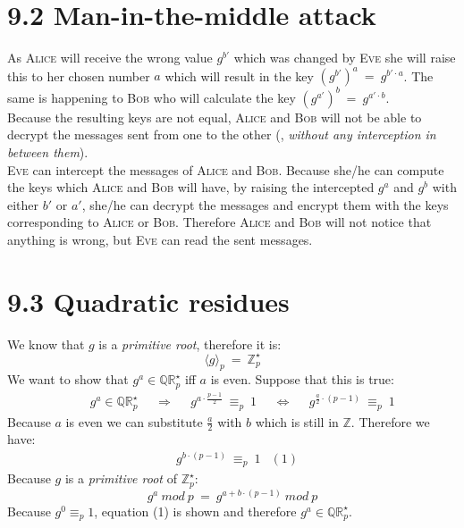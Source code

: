 \documentclass{report}
\begin{document}
	\section*{9.2 Man-in-the-middle attack}
		As \textsc{Alice} will receive the wrong value $g^{b'}$ which was changed by \textsc{Eve} she will raise this to her chosen number $a$ which will result in the key $(g^{b'})^{a} \ = \ g^{b' \cdot a}$. The same is happening to \textsc{Bob} who will calculate the key $(g^{a'})^{b} \ = \ g^{a' \cdot b}$. \\
		Because the resulting keys are not equal, \textsc{Alice} and \textsc{Bob} will not be able to decrypt the messages sent from one to the other (, \textit{without any interception in between them}). \\
		\textsc{Eve} can intercept the messages of \textsc{Alice} and \textsc{Bob}. Because she/he can compute the keys which \textsc{Alice} and \textsc{Bob} will have, by raising the intercepted $g^a$ and $g^b$ with either $b'$ or $a'$, she/he can decrypt the messages and encrypt them with the keys corresponding to \textsc{Alice} or \textsc{Bob}. Therefore \textsc{Alice} and \textsc{Bob} will not notice that anything is wrong, but \textsc{Eve} can read the sent messages.
	\section*{9.3 Quadratic residues}
		We know that $g$ is a \textit{primitive root}, therefore it is:
		\[
			\langle g \rangle _p \ = \ \mathbb{Z}_p^{\star}
		\]
		We want to show that $g^a \in \mathbb{Q}\mathbb{R}_p^{\star}$ iff $a$ is even. Suppose that this is true:
		\begin{align*}
			& & g^a \in \mathbb{Q}\mathbb{R}_p^{\star}
			& & \Rightarrow & & g^{a \cdot \frac{p-1}{2}} \ \equiv _p \ 1
			& & \Leftrightarrow & & g^{\frac{a}{2} \cdot (p-1)} \ \equiv_p \ 1
		\end{align*}
		Because $a$ is even we can substitute $\frac{a}{2}$ with $b$ which is still in $\mathbb{Z}$. Therefore we have:
		\begin{align*}
			& g^{b \cdot (p-1)} \ \equiv_p \ 1 & (1)
		\end{align*}
		Because $g$ is a \textit{primitive root} of $\mathbb{Z}_p^{\star}$:
		\[
			g^a \ mod \ p \ = \ g^{a + b \cdot (p-1)} \ mod \ p
		\]
		Because $g^0 \equiv_p 1$, equation (1) is shown and therefore $g^a \in \mathbb{Q}\mathbb{R}_p^{\star}$.
	
\end{document}
